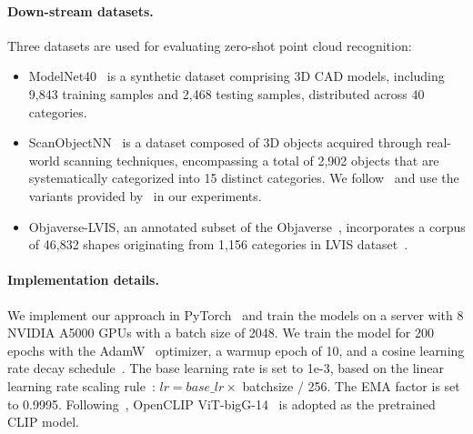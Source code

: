 \documentclass{article} \usepackage{iclr2024_conference,times}
\begin{document}
\paragraph{Down-stream datasets.}
Three datasets are used for evaluating zero-shot point cloud recognition:
\begin{itemize}[leftmargin=*,itemsep=.5ex]
\vspace{-.8em}
    \item ModelNet40~\citep{modelnet40} is a synthetic dataset comprising 3D CAD models, including 9,843 training samples and 2,468 testing samples, distributed across 40 categories.

    \item ScanObjectNN~\citep{scanobjectnn} is a dataset composed of 3D objects acquired through real-world scanning techniques, encompassing a total of 2,902 objects that are systematically categorized into 15 distinct categories. 
We follow~\citep{ulip, ulip2, openshape} and use the variants provided by~\citep{point-bert} in our experiments. 

\item Objaverse-LVIS, an annotated subset of the Objaverse~\citep{objaverse}, incorporates a corpus of 46,832 shapes originating from 1,156 categories in LVIS dataset~\citep{lvis}.
\end{itemize}

\paragraph{Implementation details.}
We implement our approach in PyTorch~\citep{pytorch} and train the models on a server with 8 NVIDIA A5000 GPUs with a batch size of 2048. 
We train the model for 200 epochs with the AdamW~\citep{AdamW} optimizer, a warmup epoch of 10, and a cosine learning rate decay schedule~\citep{cosine_lr}. 
The base learning rate is set to 1e-3, based on the linear learning rate scaling rule~\citep{linear_lr_law}: $lr = base\_lr \times$ batchsize / 256. The EMA factor is set to 0.9995. 
Following~\citet{openshape}, OpenCLIP ViT-bigG-14~\citep{openclip} is adopted as the pretrained CLIP model.
\end{document}
